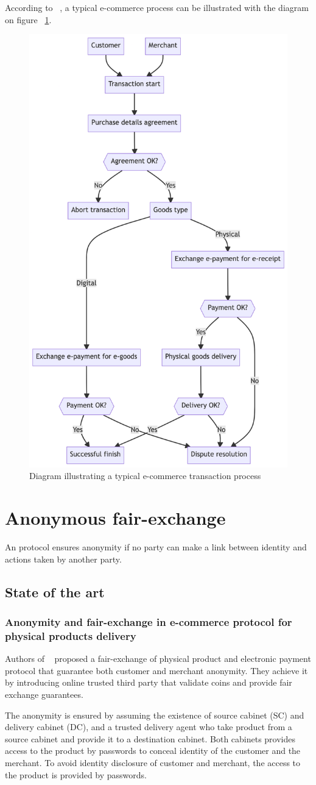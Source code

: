 \documentclass{article}
\begin{document}
According to ~\cite{djuric2015feips}, a typical e-commerce process can be illustrated with the diagram on figure ~\ref{fig:ecommerce-transaction-diagram}.

\begin{figure}[htbp]
\centerline{\includegraphics[width=.4\linewidth]{ecommerce-process.png}}
\caption{Diagram illustrating a typical e-commerce transaction process}
\label{fig:ecommerce-transaction-diagram}
\end{figure}


\section{Anonymous fair-exchange}

An protocol ensures anonymity if no party can make a link between identity and actions taken by another party.

\subsection{State of the art}
\subsubsection{Anonymity and fair-exchange in e-commerce protocol for physical products delivery}

Authors of ~\cite{birjoveanu2015anonymity} proposed a fair-exchange of physical product and electronic payment protocol that guarantee both customer and merchant anonymity. They achieve it by introducing online trusted third party that validate coins and provide fair exchange guarantees. 

The anonymity is ensured by assuming the existence of source cabinet (SC) and delivery cabinet (DC), and a trusted delivery agent who take product from a source cabinet and provide it to a destination cabinet. 
Both cabinets provides access to the product by passwords to conceal identity of the customer and the merchant.
To avoid identity disclosure of customer and merchant, the access to the product is provided by passwords. 
\end{document}
